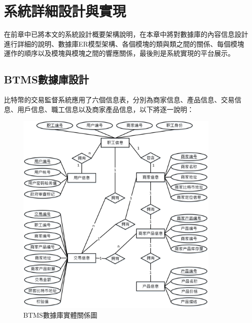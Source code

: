 \chapter{系統詳細設計與實現}
在前章中已將本文的系統設計概要架構說明，在本章中將對數據庫的內容信息設計進行詳細的說明、數據庫ER模型架構、各個模塊的類與類之間的關係、每個模塊運作的順序以及模塊與模塊之間的響應關係，最後則是系統實現的平台展示。

	\section{BTMS數據庫設計}

	比特幣的交易監督系統應用了六個信息表，分別為商家信息、產品信息、交易信息、用戶信息、職工信息以及商家產品信息，以下將逐一說明：

		\begin{figure}[!htbp]
			\centering
			\includegraphics[width = 0.9\textwidth]{er.jpg}
			\caption{BTMS數據庫實體關係圖}\label{db}
		\end{figure}

